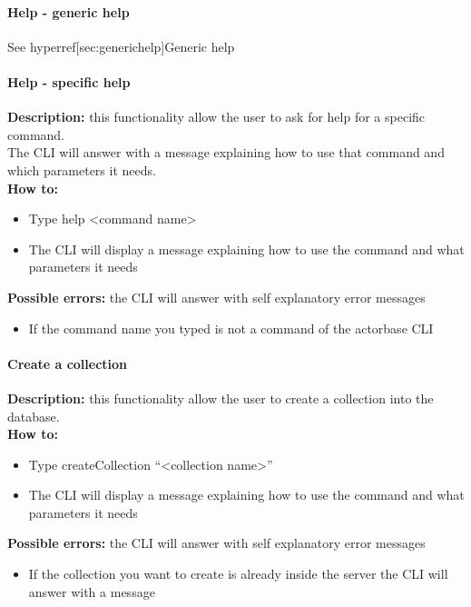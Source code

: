 \documentclass{scalatekids-article}
\begin{document}
\paragraph{Help - generic help}

See hyperref[sec:generichelp]{Generic help}

\paragraph{Help - specific help}
\label{sec:specifichelp}
\textbf{Description:} this functionality allow the user to ask for help for 
a specific command.\\
The CLI will answer with a message explaining how to use that command and 
which parameters it needs.\\
\textbf{How to:} 
\begin{itemize}
	\item Type help <command name>
	\item The CLI will display a message explaining how to use the command and what parameters it needs
\end{itemize}
\textbf{Possible errors:} the CLI will answer with self explanatory error messages 
\begin{itemize}
	\item If the command name you typed is not a command of the actorbase CLI
\end{itemize}

\paragraph{Create a collection}
\label{sec:createcollection}
\textbf{Description:} this functionality allow the user to create a 
collection into the database.\\
\textbf{How to:} 
\begin{itemize}
	\item Type createCollection ``<collection name>''
	\item The CLI will display a message explaining how to use the command and what parameters it needs
\end{itemize}
\textbf{Possible errors:} the CLI will answer with self explanatory error messages 
\begin{itemize}
	\item If the collection you want to create is already inside the server the CLI will answer with a message
\end{itemize}
\end{document}
